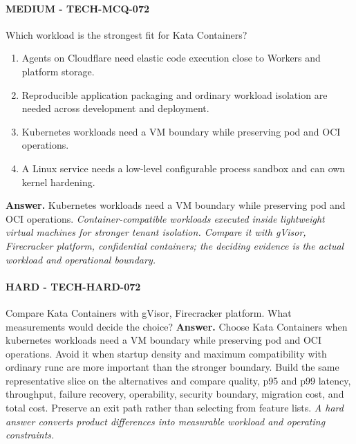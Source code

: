 \paragraph{MEDIUM - TECH-MCQ-072} Which workload is the strongest fit for Kata Containers?
\begin{enumerate}[label=\Alph*.]
\item Agents on Cloudflare need elastic code execution close to Workers and platform storage.
\item Reproducible application packaging and ordinary workload isolation are needed across development and deployment.
\item Kubernetes workloads need a VM boundary while preserving pod and OCI operations.
\item A Linux service needs a low-level configurable process sandbox and can own kernel hardening.
\end{enumerate}
\textbf{Answer.} Kubernetes workloads need a VM boundary while preserving pod and OCI operations.
\textit{Container-compatible workloads executed inside lightweight virtual machines for stronger tenant isolation. Compare it with gVisor, Firecracker platform, confidential containers; the deciding evidence is the actual workload and operational boundary.}
\paragraph{HARD - TECH-HARD-072} Compare Kata Containers with gVisor, Firecracker platform. What measurements would decide the choice?
\textbf{Answer.} Choose Kata Containers when kubernetes workloads need a VM boundary while preserving pod and OCI operations. Avoid it when startup density and maximum compatibility with ordinary runc are more important than the stronger boundary. Build the same representative slice on the alternatives and compare quality, p95 and p99 latency, throughput, failure recovery, operability, security boundary, migration cost, and total cost. Preserve an exit path rather than selecting from feature lists.
\textit{A hard answer converts product differences into measurable workload and operating constraints.}
